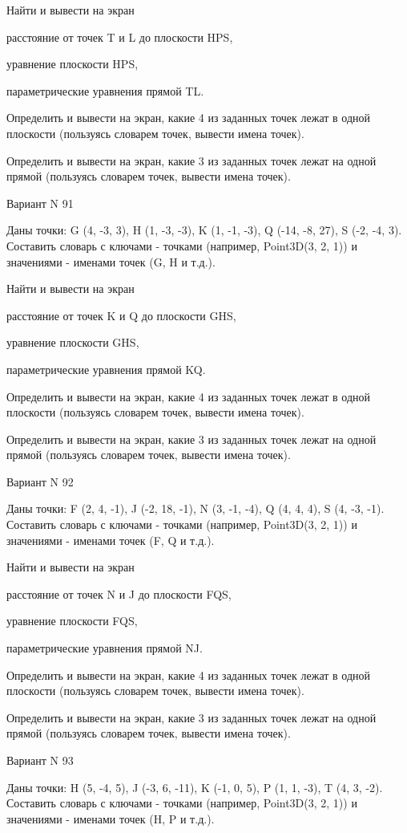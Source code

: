 \documentclass[11pt]{report}
\begin{document}
 
Найти и вывести на экран


расстояние от точек T и L до плоскости HPS,

 
уравнение плоскости HPS,

 
параметрические уравнения прямой TL.


Определить и вывести на экран, какие 4 из заданных точек лежат в одной плоскости (пользуясь словарем точек, вывести имена точек).


Определить и вывести на экран, какие 3 из заданных точек лежат на одной прямой (пользуясь словарем точек, вывести имена точек).

Вариант N 91

Даны точки: G (4, -3, 3), H (1, -3, -3), K (1, -1, -3), Q (-14, -8, 27), S (-2, -4, 3).
Составить словарь с ключами - точками (например, Point3D(3, 2, 1)) и значениями - именами точек (G, H и т.д.).

 
Найти и вывести на экран


расстояние от точек K и Q до плоскости GHS,

 
уравнение плоскости GHS,

 
параметрические уравнения прямой KQ.


Определить и вывести на экран, какие 4 из заданных точек лежат в одной плоскости (пользуясь словарем точек, вывести имена точек).


Определить и вывести на экран, какие 3 из заданных точек лежат на одной прямой (пользуясь словарем точек, вывести имена точек).

Вариант N 92

Даны точки: F (2, 4, -1), J (-2, 18, -1), N (3, -1, -4), Q (4, 4, 4), S (4, -3, -1).
Составить словарь с ключами - точками (например, Point3D(3, 2, 1)) и значениями - именами точек (F, Q и т.д.).

 
Найти и вывести на экран


расстояние от точек N и J до плоскости FQS,

 
уравнение плоскости FQS,

 
параметрические уравнения прямой NJ.


Определить и вывести на экран, какие 4 из заданных точек лежат в одной плоскости (пользуясь словарем точек, вывести имена точек).


Определить и вывести на экран, какие 3 из заданных точек лежат на одной прямой (пользуясь словарем точек, вывести имена точек).

Вариант N 93

Даны точки: H (5, -4, 5), J (-3, 6, -11), K (-1, 0, 5), P (1, 1, -3), T (4, 3, -2).
Составить словарь с ключами - точками (например, Point3D(3, 2, 1)) и значениями - именами точек (H, P и т.д.).
\end{document}
